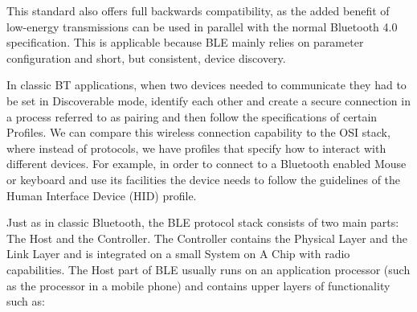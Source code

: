 This standard also offers full backwards compatibility, as the added benefit of low-energy transmissions can be used in parallel with the normal Bluetooth 4.0 specification. This is applicable because BLE mainly relies on parameter configuration and short, but consistent, device discovery.

In classic BT applications, when two devices needed to communicate they had to be set in Discoverable mode, identify each other and create a secure connection in a process referred to as pairing and then follow the specifications of certain Profiles. We can compare this wireless connection capability to the OSI stack, where instead of protocols, we have profiles that specify how to interact with different devices. For example, in order to connect to a Bluetooth enabled
Mouse or keyboard and use its facilities the device needs to follow the guidelines of the Human Interface Device (HID) profile.


Just as in classic Bluetooth\cite{haartsen2000bluetooth}, the BLE protocol stack consists of two main parts: The Host and the Controller. The Controller contains the Physical Layer and the Link Layer and is integrated on a small System on A Chip with radio capabilities. The Host part of BLE usually runs on an application processor (such as the processor in a mobile phone) and contains upper layers of functionality such as:

